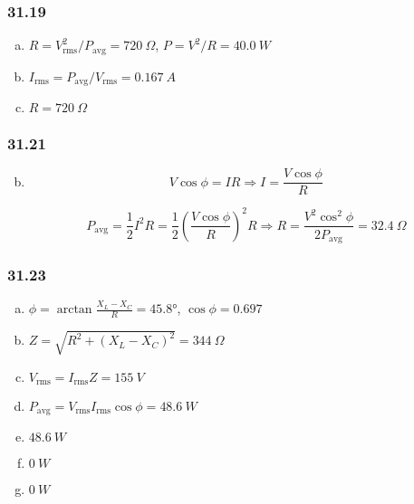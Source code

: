 \documentclass{article}
\begin{document}
\subsubsection{31.19}

\begin{enumerate}[(a)]
  \item $R = V_\text{rms}^2 / P_\text{avg} = \qty{720}{\Omega}$, $P = V^2 / R = \qty{40.0}{W}$

  \item $I_\text{rms} = P_\text{avg} / V_\text{rms} = \qty{0.167}{A}$

  \item $R = \qty{720}{\Omega}$
\end{enumerate}

\subsubsection{31.21}

\begin{enumerate}[(a)]
  \setcounter{enumi}{1}
  \item

        \[V \cos \phi = I R \Rightarrow I = \frac{V \cos \phi}{R}\]

        \[P_\text{avg} = \frac{1}{2} I^2 R = \frac{1}{2} \left( \frac{V \cos \phi}{R} \right)^2 R \Rightarrow R = \frac{V^2 \cos^2 \phi}{2 P_\text{avg}} = \qty{32.4}{\Omega}\]
\end{enumerate}

\subsubsection{31.23}

\begin{enumerate}[(a)]
  \item $\phi = \arctan \frac{X_L - X_C}{R} = \ang{45.8}$, $\cos \phi = 0.697$

  \item $Z = \sqrt{R^2 + (X_L - X_C)^2} = \qty{344}{\Omega}$

  \item $V_\text{rms} = I_\text{rms} Z = \qty{155}{V}$

  \item $P_\text{avg} = V_\text{rms} I_\text{rms} \cos \phi = \qty{48.6}{W}$

  \item $\qty{48.6}{W}$

  \item $\qty{0}{W}$

  \item $\qty{0}{W}$
\end{enumerate}
\end{document}
